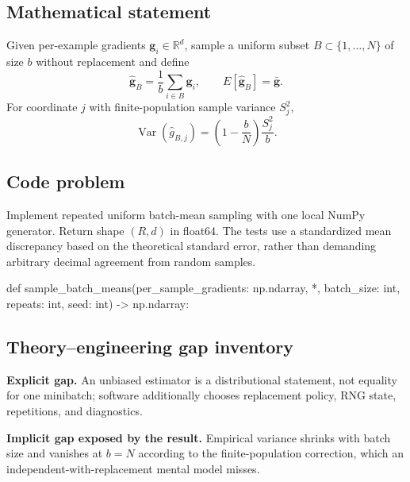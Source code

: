 
        \subsection{Mathematical statement}


Given per-example gradients $\bm g_i\in\mathbb R^d$, sample a uniform subset
$B\subset\{1,\ldots,N\}$ of size $b$ without replacement and define
\[
\hat{\bm g}_B=\frac1b\sum_{i\in B}\bm g_i,
\qquad E[\hat{\bm g}_B]=\bar{\bm g}.
\]
For coordinate $j$ with finite-population sample variance $S_j^2$,
\[
\operatorname{Var}(\hat g_{B,j})=\left(1-\frac bN\right)\frac{S_j^2}{b}.
\]


        \subsection{Code problem}


Implement repeated uniform batch-mean sampling with one local NumPy generator.
Return shape $(R,d)$ in float64.  The tests use a standardized mean discrepancy
based on the theoretical standard error, rather than demanding arbitrary decimal
agreement from random samples.


        \begin{contractbox}
        \begin{Code}
        def sample_batch_means(per_sample_gradients: np.ndarray, *, batch_size: int, repeats: int, seed: int) -> np.ndarray:
        \end{Code}
        \end{contractbox}

        \subsection{Theory--engineering gap inventory}

        \begin{gapbox}
        \textbf{Explicit gap.} An unbiased estimator is a distributional statement, not equality for one minibatch; software additionally chooses replacement policy, RNG state, repetitions, and diagnostics.

        \textbf{Implicit gap exposed by the result.} Empirical variance shrinks with batch size and vanishes at $b=N$ according to the finite-population correction, which an independent-with-replacement mental model misses.
        \end{gapbox}

